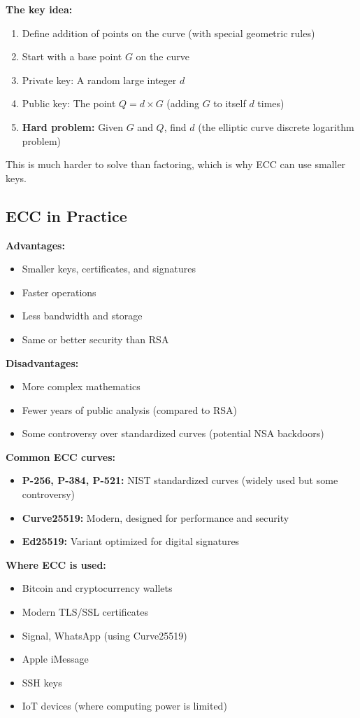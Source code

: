 \documentclass[11pt,a4paper]{report}
\begin{document}
\textbf{The key idea:}
\begin{enumerate}
\item Define addition of points on the curve (with special geometric rules)
\item Start with a base point $G$ on the curve
\item Private key: A random large integer $d$
\item Public key: The point $Q = d \times G$ (adding $G$ to itself $d$ times)
\item \textbf{Hard problem:} Given $G$ and $Q$, find $d$ (the elliptic curve discrete logarithm problem)
\end{enumerate}

This is much harder to solve than factoring, which is why ECC can use smaller keys.

\subsection{ECC in Practice}

\textbf{Advantages:}
\begin{itemize}
\item Smaller keys, certificates, and signatures
\item Faster operations
\item Less bandwidth and storage
\item Same or better security than RSA
\end{itemize}

\textbf{Disadvantages:}
\begin{itemize}
\item More complex mathematics
\item Fewer years of public analysis (compared to RSA)
\item Some controversy over standardized curves (potential NSA backdoors)
\end{itemize}

\textbf{Common ECC curves:}
\begin{itemize}
\item \textbf{P-256, P-384, P-521:} NIST standardized curves (widely used but some controversy)
\item \textbf{Curve25519:} Modern, designed for performance and security
\item \textbf{Ed25519:} Variant optimized for digital signatures
\end{itemize}

\textbf{Where ECC is used:}
\begin{itemize}
\item Bitcoin and cryptocurrency wallets
\item Modern TLS/SSL certificates
\item Signal, WhatsApp (using Curve25519)
\item Apple iMessage
\item SSH keys
\item IoT devices (where computing power is limited)
\end{itemize}
\end{document}
